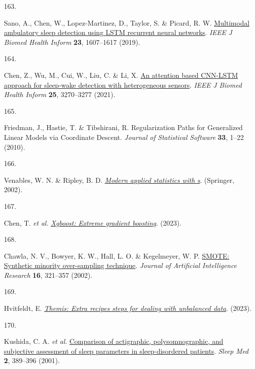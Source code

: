 \documentclass[
  10pt,
]{scrbook}
\newlength{\cslhangindent}
\newlength{\csllabelwidth}
\newlength{\cslentryspacingunit} %
\newenvironment{CSLReferences}[2] %
 {%
  \setlength{\parindent}{0pt}
  \ifodd #1
  \let\oldpar\par
  \def\par{\hangindent=\cslhangindent\oldpar}
  \fi
  \setlength{\parskip}{#2\cslentryspacingunit}
 }%
 {}
\newcommand{\CSLLeftMargin}[1]{\parbox[t]{\csllabelwidth}{#1}}
\newcommand{\CSLRightInline}[1]{\parbox[t]{\linewidth - \csllabelwidth}{#1}\break}
\let\originaltextbf\textbf
\renewcommand{\textbf}[1]{\textcolor{color1}{\textsf{\originaltextbf{#1}}}}
\begin{document}
\begin{CSLReferences}{0}{0}
\leavevmode{}%
\CSLLeftMargin{163. }%
\CSLRightInline{Sano, A., Chen, W., Lopez-Martinez, D., Taylor, S. \&
Picard, R. W.
\href{https://doi.org/10.1109/JBHI.2018.2867619}{Multimodal ambulatory
sleep detection using {LSTM} recurrent neural networks}. \emph{{IEEE} J
Biomed Health Inform} \textbf{23}, 1607--1617 (2019).}

\leavevmode{}%
\CSLLeftMargin{164. }%
\CSLRightInline{Chen, Z., Wu, M., Cui, W., Liu, C. \& Li, X.
\href{https://doi.org/10.1109/JBHI.2020.3006145}{An attention based
{CNN}-{LSTM} approach for sleep-wake detection with heterogeneous
sensors}. \emph{{IEEE} J Biomed Health Inform} \textbf{25}, 3270--3277
(2021).}

\leavevmode{}%
\CSLLeftMargin{165. }%
\CSLRightInline{Friedman, J., Hastie, T. \& Tibshirani, R.
Regularization Paths for Generalized Linear Models via Coordinate
Descent. \emph{Journal of Statistical Software} \textbf{33}, 1--22
(2010).}

\leavevmode{}%
\CSLLeftMargin{166. }%
\CSLRightInline{Venables, W. N. \& Ripley, B. D.
\emph{\href{https://www.stats.ox.ac.uk/pub/MASS4/}{Modern applied
statistics with s}}. (Springer, 2002).}

\leavevmode{}%
\CSLLeftMargin{167. }%
\CSLRightInline{Chen, T. \emph{et al.}
\emph{\href{https://CRAN.R-project.org/package=xgboost}{Xgboost: Extreme
gradient boosting}}. (2023).}

\leavevmode{}%
\CSLLeftMargin{168. }%
\CSLRightInline{Chawla, N. V., Bowyer, K. W., Hall, L. O. \& Kegelmeyer,
W. P. \href{https://doi.org/10.1613/jair.953}{{SMOTE}: Synthetic
minority over-sampling technique}. \emph{Journal of Artificial
Intelligence Research} \textbf{16}, 321--357 (2002).}

\leavevmode{}%
\CSLLeftMargin{169. }%
\CSLRightInline{Hvitfeldt, E.
\emph{\href{https://CRAN.R-project.org/package=themis}{Themis: Extra
recipes steps for dealing with unbalanced data}}. (2023).}

\leavevmode{}%
\CSLLeftMargin{170. }%
\CSLRightInline{Kushida, C. A. \emph{et al.}
\href{https://doi.org/10.1016/s1389-9457(00)00098-8}{Comparison of
actigraphic, polysomnographic, and subjective assessment of sleep
parameters in sleep-disordered patients}. \emph{Sleep Med} \textbf{2},
389--396 (2001).}


\end{CSLReferences}
\end{document}
